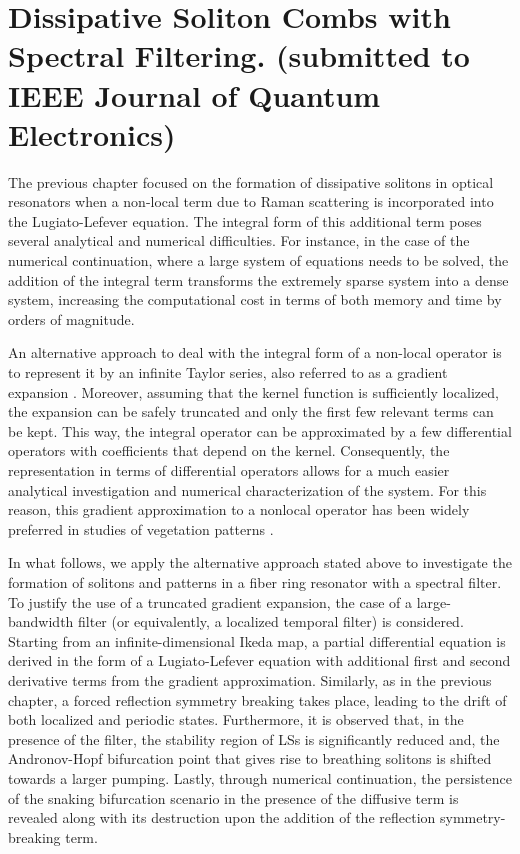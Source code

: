 \chapter{Dissipative Soliton Combs with Spectral Filtering. (submitted to IEEE Journal of Quantum Electronics)}

The previous chapter focused on the formation of dissipative solitons in optical
resonators when a non-local term due to Raman scattering is incorporated into the Lugiato-Lefever equation. The
integral form of this additional term poses several analytical and numerical difficulties.
For instance, in the case of the numerical continuation, where a
large system of equations needs to be solved, the addition of the integral term transforms the extremely sparse
system into a dense system, increasing the computational cost in terms of both memory and time
by orders of magnitude.

An alternative approach to deal with the integral form of a non-local operator is to represent
it by an infinite Taylor series, also referred to as a gradient expansion \cite{murray2003mathematical}. Moreover, 
assuming that the kernel function is sufficiently localized, the expansion can be
safely truncated and only the first few relevant terms can be kept. This way, the integral operator can be
approximated by a few differential operators with coefficients that depend on
the kernel. Consequently, the representation in terms of differential operators
allows for a much easier analytical investigation and numerical characterization of the system.
For this reason, this gradient approximation to a nonlocal operator has been widely 
preferred in studies of vegetation patterns \cite{lefever1997origin,clerc2021localised,pinto2022vegetation,pinto2023topological}.

In what follows, we apply the alternative approach stated above to investigate
the formation of solitons and patterns in a fiber ring resonator with a spectral filter.
To justify the use of a truncated gradient expansion, the case of a large-bandwidth filter
(or equivalently, a localized temporal filter) is considered. Starting from an infinite-dimensional
Ikeda map, a partial differential equation is derived in the form of a Lugiato-Lefever equation with additional
first and second derivative terms from the gradient approximation. Similarly, as in the previous chapter,
a forced reflection symmetry breaking takes place, leading to the drift of both localized and periodic states.
Furthermore, it is observed that, in the presence of the filter, the stability region of LSs is significantly reduced
and, the Andronov-Hopf bifurcation point that gives rise to breathing solitons is shifted towards a larger pumping.
Lastly, through numerical continuation, the persistence of the snaking bifurcation scenario in
the presence of the diffusive term is revealed along with its destruction upon the addition of the reflection symmetry-breaking term.

